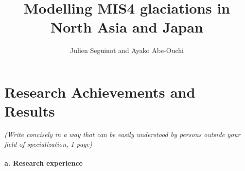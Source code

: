 \documentclass{article}
\title{Modelling MIS4 glaciations in North Asia and Japan}
\author{Julien Seguinot and Ayako Abe-Ouchi}
\begin{document}

\maketitle


\setcounter{section}{15}
\section{Research Achievements and Results}

    \emph{(Write concisely in a way that can be easily understood by persons
          outside your field of specialization, 1 page)}

\paragraph{a. Research experience}
\end{document}
